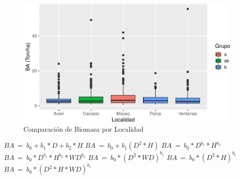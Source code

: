 \documentclass[9pt,onecolumn,twoside,]{pinp}
\begin{document}
\begin{figure}

{\centering \includegraphics{David_Londono_Lopera_Cristian_Ganan_parcial3_files/figure-latex/unnamed-chunk-32-1} 

}

\caption{Comparación de Biomasa por Localidad}\label{fig:unnamed-chunk-32}
\end{figure}

\(BA \ = \ b_0 + b_1*D+b_2*H\) \(BA \ = \ b_0+b_1(D^2*H)\)
\(BA \ = \ b_0*D^{b_1}*H^{b_2}\)
\(BA \ = \ b_0*D^{b_1}*H^{b_2}*WD^{b_3}\)
\(BA \ = \ b_0*(D^2*WD)^{b_1}\) \(BA \ = \ b_0*(D^2*H)^{b_1}\)
\(BA \ = \ b_0*(D^2*H*WD)^{b_1}\)


\pnasbreak 
\end{document}
